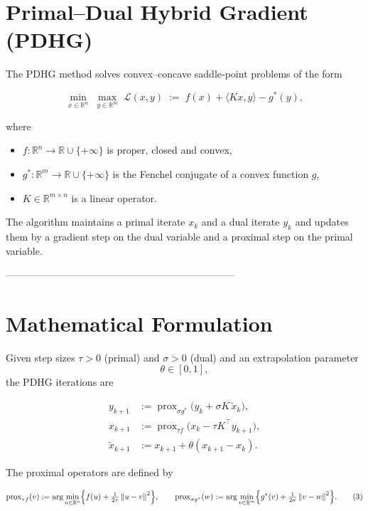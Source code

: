 \documentclass{article}
\newcommand{\norm}[1]{\left\lVert#1\right\rVert}
\begin{document}
\section*{Primal–Dual Hybrid Gradient (PDHG)}

The PDHG method solves convex–concave saddle‑point problems of the form  

\[
\min_{x\in\mathbb R^{n}} \; \max_{y\in\mathbb R^{m}}
\; \mathcal L(x,y)\;:=\; f(x)+\langle Kx,y\rangle-g^{*}(y),
\tag{1}
\]

where  

\begin{itemize}[nosep]
  \item $f:\mathbb R^{n}\!\to\!\mathbb R\cup\{+\infty\}$ is proper, closed and convex,
  \item $g^{*}:\mathbb R^{m}\!\to\!\mathbb R\cup\{+\infty\}$ is the Fenchel conjugate of a convex function $g$,
  \item $K\in\mathbb R^{m\times n}$ is a linear operator.
\end{itemize}
The algorithm maintains a primal iterate $x_k$ and a dual iterate $y_k$ and updates them by a gradient step on the dual variable and a proximal step on the primal variable.

---------------------------------------------------------------------

\section*{Mathematical Formulation}
Given step sizes $\tau>0$ (primal) and $\sigma>0$ (dual) and an extrapolation parameter
\[
\theta\in[0,1],
\]
the PDHG iterations are  

\[
\boxed{
\begin{aligned}
y_{k+1} &:= \operatorname{prox}_{\sigma g^{*}}\!\bigl(y_{k}+ \sigma K \,\tilde x_{k}\bigr), \tag{2a}\\[4pt]
x_{k+1} &:= \operatorname{prox}_{\tau f}\!\bigl(x_{k}-\tau K^{\!\top} y_{k+1}\bigr), \tag{2b}\\[4pt]
\tilde x_{k+1} &:= x_{k+1}+ \theta (x_{k+1}-x_{k}). \tag{2c}
\end{aligned}}
\]

The proximal operators are defined by  

\[
\operatorname{prox}_{\tau f}(v):= \arg\min_{u\in\mathbb R^{n}}
\Bigl\{ f(u)+\tfrac{1}{2\tau}\norm{u-v}^{2}\Bigr\},
\qquad
\operatorname{prox}_{\sigma g^{*}}(w):= \arg\min_{v\in\mathbb R^{m}}
\Bigl\{ g^{*}(v)+\tfrac{1}{2\sigma}\norm{v-w}^{2}\Bigr\}.
\tag{3}
\]
\end{document}
